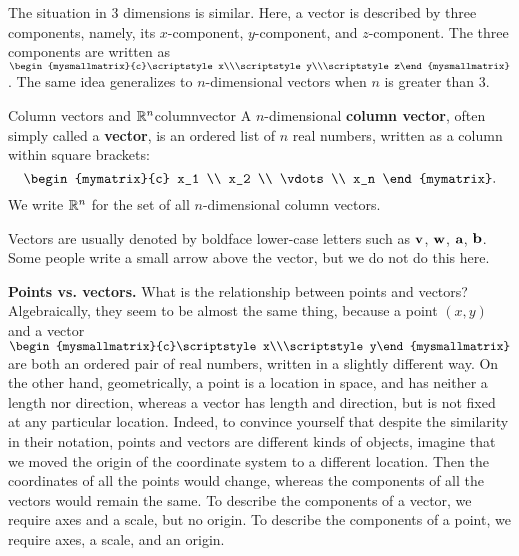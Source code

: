 The situation in $3$ dimensions is similar. Here, a vector is
described by three components, namely, its $x$-component,
$y$-component, and $z$-component. The three components are written as
$\begin{mysmallmatrix}{c}\scriptstyle x\\\scriptstyle y\\\scriptstyle
  z\end{mysmallmatrix}$. The same idea generalizes to $n$-dimensional
vectors when $n$ is greater than $3$. 

\begin{definition}{Column vectors and $\mathbb{R}^n$}{columnvector}
  A $n$-dimensional
  \textbf{column vector},
  often simply called a \textbf{vector}, is an ordered list
  of $n$ real numbers, written as a column within square brackets:
  \begin{equation*}
    \begin{mymatrix}{c}
      x_1 \\
      x_2 \\
      \vdots \\
      x_n
    \end{mymatrix}.
  \end{equation*}
  We write $\mathbb{R}^n$ for the set of all $n$-dimensional
  column vectors.
\end{definition}
Vectors are usually denoted by boldface lower-case letters such as
$\mbox{\bf v}$, $\mbox{\bf w}$, $\mbox{\bf a}$, $\mbox{\bf b}$. Some people write a
small arrow above the vector, but we do not do this here.
\bigskip

\noindent\textbf{Points vs. vectors.}
What is the relationship between points and vectors? Algebraically,
they seem to be almost the same thing, because a point $(x,y)$ and a
vector
$\begin{mysmallmatrix}{c}\scriptstyle x\\\scriptstyle
  y\end{mysmallmatrix}$ are both an ordered pair of real numbers,
written in a slightly different way. On the other hand, geometrically,
a point is a location in space, and has neither a length nor
direction, whereas a vector has length and direction, but is not fixed
at any particular location. Indeed, to convince yourself that despite
the similarity in their notation, points and vectors are different
kinds of objects, imagine that we moved the origin of the coordinate
system to a different location. Then the coordinates of all the points
would change, whereas the components of all the vectors would remain
the same. To describe the components of a vector, we require axes and
a scale, but no origin. To describe the components of a point, we
require axes, a scale, and an origin.  \bigskip

